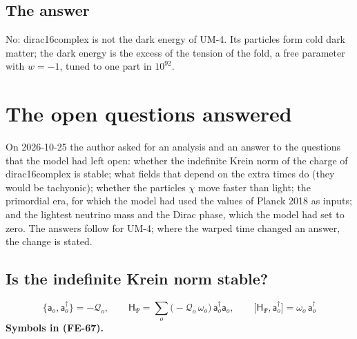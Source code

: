 \documentclass[
  10pt,
]{article}
\begin{document}
\hypertarget{the-answer-2}{%
\subsection{The answer}\label{the-answer-2}}

No: dirac16complex is not the dark energy of UM-4. Its particles form
cold dark matter; the dark energy is the excess of the tension of the
fold, a free parameter with \(w = -1\), tuned to one part in
\(10^{92}\).

\hypertarget{the-open-questions-answered}{%
\section{The open questions
answered}\label{the-open-questions-answered}}

On 2026-10-25 the author asked for an analysis and an answer to the
questions that the model had left open: whether the indefinite Krein
norm of the charge of dirac16complex is stable; what fields that depend
on the extra times do (they would be tachyonic); whether the particles
\(\chi\) move faster than light; the primordial era, for which the model
had used the values of Planck 2018 as inputs; and the lightest neutrino
mass and the Dirac phase, which the model had set to zero. The answers
follow for UM-4; where the warped time changed an answer, the change is
stated.

\hypertarget{is-the-indefinite-krein-norm-stable}{%
\subsection{Is the indefinite Krein norm
stable?}\label{is-the-indefinite-krein-norm-stable}}

\[
\big\{\mathsf{a}_o, \mathsf{a}_o^\dagger\big\} = -\mathcal{Q}_o,\qquad
\mathsf{H}_\Psi = \sum_o\big(-\mathcal{Q}_o\,\omega_o\big)\,\mathsf{a}_o^\dagger\mathsf{a}_o,\qquad
\big[\mathsf{H}_\Psi, \mathsf{a}_o^\dagger\big] = \omega_o\,\mathsf{a}_o^\dagger \tag{FE-67}
\] \textbf{Symbols in (FE-67).}
\end{document}
